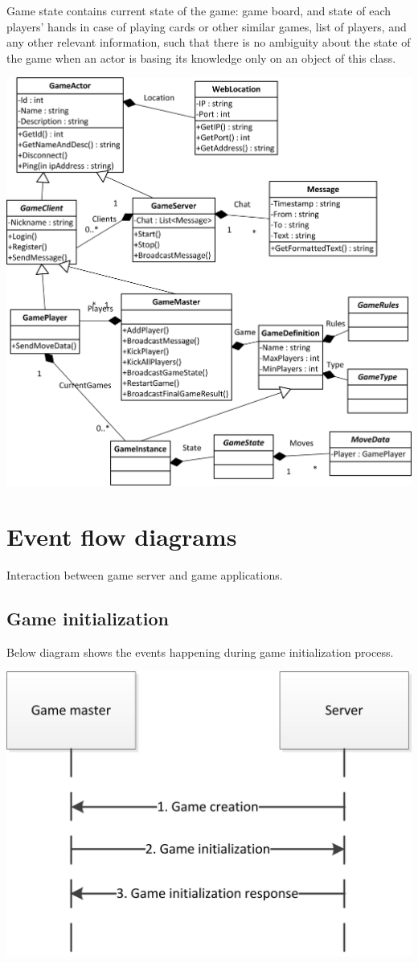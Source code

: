 \documentclass{article}
\begin{document}
Game state contains current state of the game: game board, and state of each players' hands 
in case of playing cards or other similar games, list of players, and any other relevant information, 
such that there is no ambiguity about the state of the game when an actor is basing its knowledge 
only on an object of this class.

\includegraphics[scale=1.20]{UGS_classes.jpg}


\pagebreak[4]


\section{Event flow diagrams}
Interaction between game server and game applications.

\subsection{Game initialization}
Below diagram shows the events happening during game initialization process.
 
\includegraphics[scale=1.00]{UGS_events_Game_initilalization.jpg}
\end{document}
